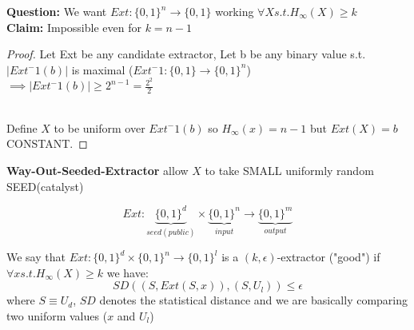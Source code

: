 \textbf{Question: }We want $Ext:\{0,1\}^n \to \{0,1\}$ working $\forall X s.t. H_{\infty}(X)\geq k$\\
\textbf{Claim: } Impossible even for $k=n-1$
\begin{proof}
    Let Ext be any candidate extractor, Let b be any binary value s.t. $|Ext^-1(b)|$ is maximal ($Ext^-1: \{0,1\} \to \{0,1\}^n$)\\
    $\implies |Ext^-1(b)|\geq 2^{n-1}=\frac{2^2}{2}$

    \\
    \bigskip
    Define $X$ to be uniform over $Ext^-1(b)$ so $H_{\infty}(x)=n-1$ but $Ext(X)=b$ CONSTANT.
\end{proof}

\begin{theorem}
    \textbf{Way-Out-Seeded-Extractor} allow $X$ to take SMALL uniformly random SEED(catalyst)

    $$Ext: \underbrace{\{0,1\}^d}_{seed(public)}\times \underbrace{\{0,1\}^n}_{input} \to \underbrace{\{0,1\}^m}_{output}$$
\end{theorem}
\begin{definition}
    We say that $Ext:\{0,1\}^d \times \{0,1\}^n \to \{0,1\}^l$ is a $(k,\epsilon)$-extractor ("good") if $\forall x s.t. H_{\infty}(X)\geq k$ we have:
    $$SD((S,Ext(S,x)),(S,U_l))\leq \epsilon$$ 
    where $S\equiv U_d$, $SD$ denotes the statistical distance and we are basically comparing two uniform values ($x$ and $U_l$) 
\end{definition}

